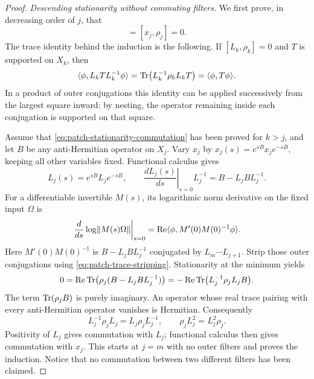 \begin{proof}
\emph{Descending stationarity without commuting filters.}
We first prove, in decreasing order of \(j\), that
\begin{equation}
 [L_j,\rho_j]=[x_j,\rho_j]=0.
 \label{eq:patch-stationarity-commutation}
\end{equation}
The trace identity behind the induction is the following.  If
\([L_k,\rho_k]=0\) and \(T\) is supported on \(X_k\), then
\begin{equation}
 \langle\phi,L_k T L_k^{-1}\phi\rangle
   =\operatorname{Tr}\bigl(L_k^{-1}\rho_k L_k T\bigr)
   =\langle\phi,T\phi\rangle .
 \label{eq:patch-trace-stripping}
\end{equation}
In a product of outer conjugations this identity can be applied
successively from the largest square inward: by nesting, the operator
remaining inside each conjugation is supported on that square.

Assume that \eqref{eq:patch-stationarity-commutation} has been proved
for \(k>j\), and let \(B\) be any anti-Hermitian operator on \(X_j\).
Vary \(x_j\) by \(x_j(s)=e^{sB}x_j e^{-sB}\), keeping all other
variables fixed.  Functional calculus gives
\[
 L_j(s)=e^{sB}L_j e^{-sB},\qquad
 \left.\frac{dL_j(s)}{ds}\right|_{s=0}L_j^{-1}
       =B-L_j B L_j^{-1}.
\]
For a differentiable invertible \(M(s)\), its logarithmic norm
derivative on the fixed input \(\Omega\) is
\[
 \left.\frac{d}{ds}\log\lVert M(s)\Omega\rVert\right|_{s=0}
   =\operatorname{Re}
       \langle\phi,M'(0)M(0)^{-1}\phi\rangle .
\]
Here \(M'(0)M(0)^{-1}\) is \(B-L_j B L_j^{-1}\) conjugated
by \(L_m\cdots L_{j+1}\).  Strip those outer conjugations using
\eqref{eq:patch-trace-stripping}.  Stationarity at the minimum yields
\[
 0=\operatorname{Re}\operatorname{Tr}\bigl(\rho_j(B-L_j B L_j^{-1})\bigr)
   =-\operatorname{Re}\operatorname{Tr}\bigl(L_j^{-1}\rho_jL_j B\bigr).
\]
The term \(\operatorname{Tr}(\rho_jB)\) is purely imaginary.  An operator whose
real trace pairing with every anti-Hermitian operator vanishes is
Hermitian.  Consequently
\[
 L_j^{-1}\rho_jL_j=L_j\rho_jL_j^{-1},
 \qquad
 \rho_jL_j^2=L_j^2\rho_j .
\]
Positivity of \(L_j\) gives commutation with \(L_j\); functional
calculus then gives commutation with \(x_j\).  This starts at \(j=m\)
with no outer filters and proves the induction.  Notice that no
commutation between two different filters has been claimed.


\end{proof}
